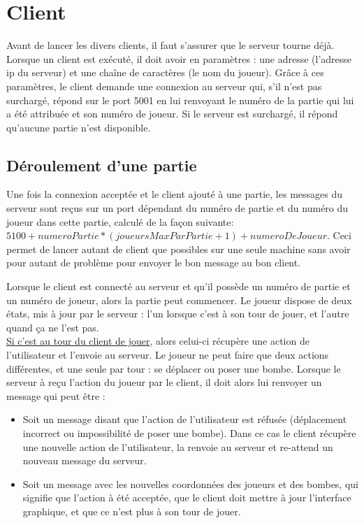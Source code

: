 \section*{Client}

Avant de lancer les divers clients, il faut s'assurer que le serveur tourne déjà. Lorsque un client est exécuté, il doit avoir en paramètres : une adresse (l'adresse ip du serveur) et une chaîne de caractères (le nom du joueur). Grâce à ces paramètres, le client demande une connexion au serveur qui, s'il n'est pas surchargé, répond sur le port 5001 en lui renvoyant le numéro de la partie qui lui a été attribuée et son numéro de joueur. Si le serveur est surchargé, il répond qu'aucune partie n'est disponible.


\subsection*{Déroulement d'une partie}

Une fois la connexion acceptée et le client ajouté à une partie, les messages du serveur sont reçus sur un port dépendant du numéro de partie et du numéro du joueur dans cette partie, calculé de la façon suivante: \( 5100 + numeroPartie * (joueursMaxParPartie + 1) + numeroDeJoueur\). Ceci permet de lancer autant de client que possibles sur une seule machine sans avoir pour autant de problème pour envoyer le bon message au bon client.

Lorsque le client est connecté au serveur et qu'il possède un numéro de partie et un numéro de joueur, alors la partie peut commencer. Le joueur dispose de deux états, mis à jour par le serveur : l'un lorsque c'est à son tour de jouer, et l'autre quand ça ne l'est pas.\\ 

\underline{Si c'est au tour du client de jouer}, alors celui-ci récupère une action de l'utilisateur et l'envoie au serveur. Le joueur ne peut faire que deux actions différentes, et une seule par tour : se déplacer ou poser une bombe. Lorsque le serveur à reçu l'action du joueur par le client, il doit alors lui renvoyer un message qui peut être :
\begin{itemize}
	\item Soit un message disant que l'action de l'utilisateur est réfusée (déplacement incorrect ou impossibilité de poser une bombe). Dans ce cas le client récupère une nouvelle action de l'utilisateur, la renvoie au serveur et re-attend un nouveau message du serveur.
	\item Soit un message avec les nouvelles coordonnées des joueurs et des bombes, qui signifie que l'action à été acceptée, que le client doit mettre à jour l'interface graphique, et que ce n'est plus à son tour de jouer.
\end{itemize}

